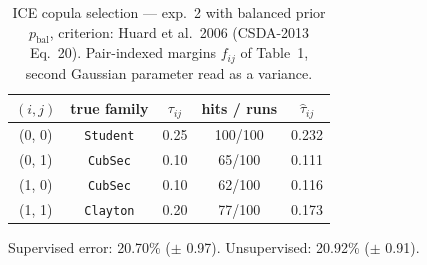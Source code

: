 \begin{table}[htbp]
  \centering
  \caption{ICE copula selection — exp.\ 2 with balanced prior $p_{\text{bal}}$, criterion: Huard et al.\ 2006 (CSDA-2013 Eq.\ 20). Pair-indexed margins $f_{ij}$ of Table~1, second Gaussian parameter read as a variance.}
  \label{tab:exp3-exp2_bal_p__huard}
  \begin{tabular}{ccccc}
    \toprule
    $(i, j)$ & true family & $\tau_{ij}$ & hits / runs & $\hat\tau_{ij}$ \\
    \midrule
    (0, 0) & \texttt{Student} & 0.25 & 100/100 & 0.232 \\
    (0, 1) & \texttt{CubSec} & 0.10 & 65/100 & 0.111 \\
    (1, 0) & \texttt{CubSec} & 0.10 & 62/100 & 0.116 \\
    (1, 1) & \texttt{Clayton} & 0.20 & 77/100 & 0.173 \\
    \bottomrule
  \end{tabular}
  \par\smallskip Supervised error: 20.70\% ($\pm$ 0.97). Unsupervised: 20.92\% ($\pm$ 0.91).
\end{table}
